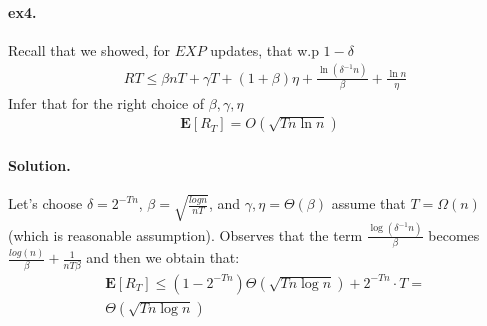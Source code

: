 \documentclass{article}
\newcommand{\expp}[1]{ \mathbf{E} \left[ {#1} \right]}
\begin{document}
\begin{multicols*}{2}
  \paragraph{ex4.} Recall that we showed, for $EXP$ updates, that w.p $1 - \delta$ 
  \begin{equation*}
    \begin{split}
      &  R{T} \le \beta n T + \gamma T + \left( 1 + \beta \right)\eta + \frac{\ln\left( \delta^{-1} n \right) }{\beta} + \frac{\ln n}{\eta}  
    \end{split}
  \end{equation*}
  Infer that for the right choice of $\beta,\gamma, \eta$ 
  \begin{equation*}
    \begin{split}
      \expp{R_{T}} = O\left( \sqrt{T n \ln n } \right)
    \end{split}
  \end{equation*}
  \paragraph{Solution.} Let's choose $\delta = 2^{-Tn}$, $\beta = \sqrt{\frac{log n }{nT}}$, and $\gamma, \eta = \Theta\left( \beta \right)$ assume that $T = \Omega(n)$ (which is reasonable assumption). Observes that the term $\frac{\log\left( \delta^{-1}n \right)}{\beta}$ becomes $ \frac{log\left( n \right)}{\beta} + \frac{1}{nT\beta} $ and then we obtain that:  
  \begin{equation*}
    \begin{split}
      & \expp{R_{T}} \le \left( 1 - 2^{-Tn} \right)\Theta\left( \sqrt{ Tn\log n} \right)+ 2^{-Tn} \cdot T = \\ 
      & \Theta\left( \sqrt{ Tn\log n} \right)
    \end{split}
  \end{equation*}
\end{multicols*}
  \printbibliography 
\end{document}

